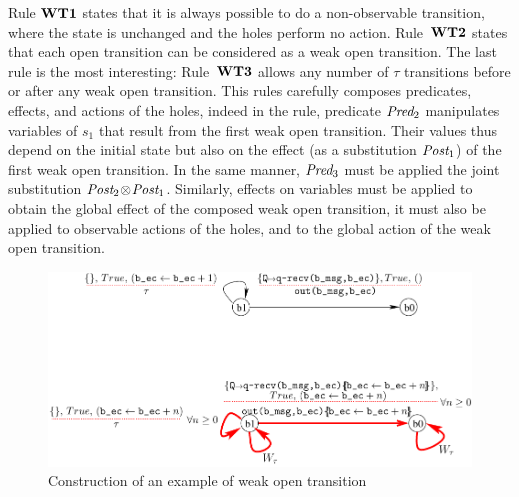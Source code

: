 \documentclass{lmcs}
\newcommand{\shortotimes}{\!\otimes\!}
\begin{document}
Rule $\textbf{WT1}$ states that it is always possible to do a non-observable transition, where the state is unchanged and the holes perform no action. Rule~$\textbf{WT2}$ states that each open transition can be considered as a weak open transition. The last rule is the most interesting:  Rule~$\textbf{WT3}$ allows any number of $\tau$ transitions before or after any weak open transition. This rules carefully composes predicates, effects, and actions of the holes, indeed in the rule, predicate $\Pred_2$ manipulates variables of $s_1$ that result from the first weak open transition. Their values thus depend on the initial state but also on the effect (as a substitution $\Post_1$) of the first weak open transition. In the same manner, $\Pred_3$ must be applied the joint substitution $\Post_2\shortotimes\Post_1$. Similarly, effects on variables must be applied to obtain the global effect of the composed weak open transition, it must also be applied to observable actions of the holes, and to the global action of the weak open transition.



\begin{figure}[ht]
   \centerline{\includegraphics[width=13cm]{XFIG/WOT2-result}}
  \caption{Construction of an example of weak open transition}
   \label{WOT2}
\end{figure}
\end{document}
